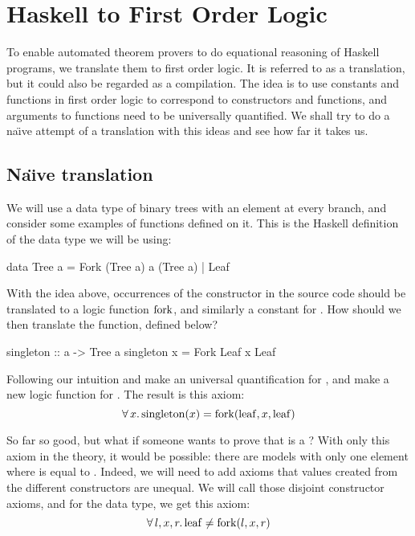 \chapter{Haskell to First Order Logic}

To enable automated theorem provers to do equational reasoning of
Haskell programs, we translate them to first order logic. It is
referred to as a translation, but it could also be regarded as a
compilation. The idea is to use constants and functions in first order
logic to correspond to constructors and functions, and arguments to
functions need to be universally quantified. We shall try to do a
na\"{\i}ve attempt of a translation with this ideas and see how far it
takes us.

\section{Na\"{\i}ve translation}

We will use a data type of binary trees with an element at every
branch, and consider some examples of functions defined on it. This
is the Haskell definition of the data type we will be using:

\begin{code}
data Tree a = Fork (Tree a) a (Tree a) | Leaf
\end{code}
With the idea above, occurrences of the  constructor in the
source code should be translated to a logic function $\mathrm{fork}$, and
similarly a constant for . How should we then translate the
 function, defined below?

\begin{code}
singleton :: a -> Tree a
singleton x = Fork Leaf x Leaf
\end{code}

\noindent
Following our intuition and make an universal quantification for
, and make a new logic function for . The result
is this axiom:
\begin{equation*}
\forall \, x . \, \mathrm{singleton}(x) = \mathrm{fork}(\mathrm{leaf},x,\mathrm{leaf})
\end{equation*}

\noindent
So far so good, but what if someone wants to prove that 
is a ? With only this axiom in the theory, it would be
possible: there are models with only one element where  is
equal to . Indeed, we will need to add axioms that values
created from the different constructors are unequal. We will call
those disjoint constructor axioms, and for the  data type, we
get this axiom:
\begin{equation*}
\forall \, l , x , r . \, \mathrm{leaf} \neq \mathrm{fork}(l,x,r)
\end{equation*}

